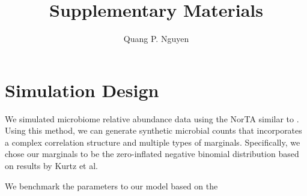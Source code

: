 \documentclass{article}
\author{Quang P. Nguyen}
\title{Supplementary Materials}
\begin{document}
\maketitle

\section{Simulation Design}
We simulated microbiome relative abundance data using the NorTA similar to \cite{cairo}. Using this method, we can generate synthetic microbial counts that incorporates a complex correlation structure and multiple types of marginals. Specifically, we chose our marginals to be the zero-inflated negative binomial distribution based on results by Kurtz et al. \cite{kurtz2015}

We benchmark the parameters to our model based on the 


{}

\end{document}
